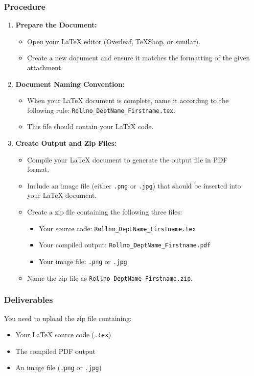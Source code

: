 \documentclass[a4paper,12pt]{report}
\begin{document}
\subsubsection*{Procedure}
\begin{enumerate}[label=\arabic*.]
    \item \textbf{Prepare the Document:}
    \begin{itemize}
        \item Open your LaTeX editor (Overleaf, TeXShop, or similar).
        \item Create a new document and ensure it matches the formatting of the given attachment.
    \end{itemize}
    
    \item \textbf{Document Naming Convention:}
    \begin{itemize}
        \item When your LaTeX document is complete, name it according to the following rule: \texttt{Rollno\_DeptName\_Firstname.tex}.
        \item This file should contain your LaTeX code.
    \end{itemize}
    
    \item \textbf{Create Output and Zip Files:}
    \begin{itemize}
        \item Compile your LaTeX document to generate the output file in PDF format.
        \item Include an image file (either \texttt{.png} or \texttt{.jpg}) that should be inserted into your LaTeX document.
        \item Create a zip file containing the following three files:
        \begin{itemize}
            \item Your source code: \texttt{Rollno\_DeptName\_Firstname.tex}
            \item Your compiled output: \texttt{Rollno\_DeptName\_Firstname.pdf}
            \item Your image file: \texttt{.png} or \texttt{.jpg}
        \end{itemize}
        \item Name the zip file as \texttt{Rollno\_DeptName\_Firstname.zip}.
    \end{itemize}
\end{enumerate}

\subsubsection*{Deliverables}
You need to upload the zip file containing:
\begin{itemize}
    \item Your LaTeX source code (\texttt{.tex})
    \item The compiled PDF output
    \item An image file (\texttt{.png} or \texttt{.jpg})
\end{itemize}
\newpage
\end{document}
